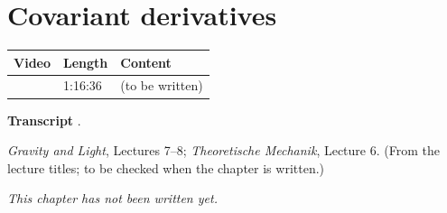 \chapter{Covariant derivatives}\label{ch:l25}
\begin{paracol}{2}

\begin{sources}
\begin{tabularx}{\linewidth}{@{}l l L@{}}
\toprule
\textbf{Video} & \textbf{Length} & \textbf{Content}\\
\midrule
{} & 1:16:36 & (to be written)\\
\bottomrule
\end{tabularx}

\smallskip
\textbf{Transcript} .
\end{sources}

\begin{reading}
\emph{Gravity and Light}, Lectures 7--8; \emph{Theoretische Mechanik}, Lecture 6. (From the lecture titles; to be checked when the chapter is written.)
\end{reading}

\emph{This chapter has not been written yet.}

\flushside
\end{paracol}
